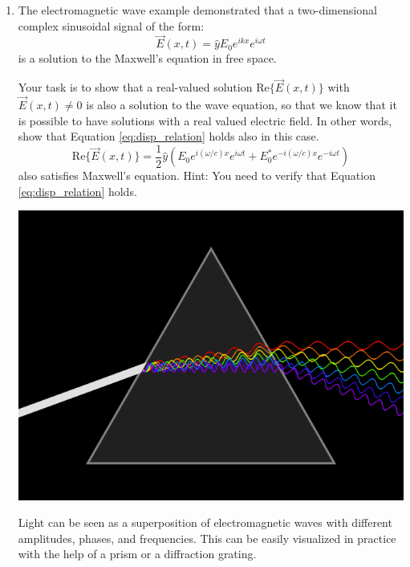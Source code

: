 \begin{enumerate}
\item The electromagnetic wave example demonstrated that a two-dimensional complex sinusoidal signal of the form:
\begin{equation}
    \vec{E}(x,t) = \hat{y}E_0 e^{i k x} e^{i \omega t}
\end{equation}
is a solution to the Maxwell's equation in free space.

Your task is to show that a real-valued solution $\mathrm{Re}\{\vec{E}(x,t)\}$ with $\vec{E}(x,t)\ne 0$ is also a solution to the wave equation, 
so that we know that it is possible to have solutions with a real valued electric field. In other words, show that Equation \ref{eq:disp_relation} holds also in this case.
  \begin{equation}
    \mathrm{Re}\{\vec{E}(x,t)\} = \frac{1}{2}\hat{y}\left(E_0 e^{i (\omega/c) x} e^{i \omega t} + E_0^* e^{-i (\omega/c) x} e^{-i \omega t}\right)
  \end{equation}
  also satisfies Maxwell's equation. Hint: You need to verify that
  Equation \ref{eq:disp_relation} holds.
\fi
  \begin{marginfigure}[0cm]
\begin{center}
  \includegraphics[width=\textwidth]{ch06/figures/prism.png}
\end{center}
\caption{Light can be seen as a superposition of electromagnetic waves with different amplitudes, phases, and frequencies. This can be easily visualized in practice with the help of a prism or a diffraction grating.}
\label{fig:prism_ex}
\end{marginfigure}


\end{enumerate}
